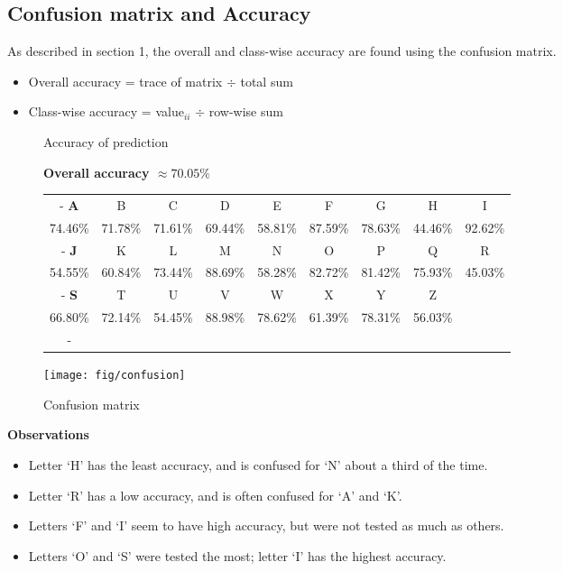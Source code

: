 \newpage
\subsection{Confusion matrix and Accuracy}
As described in section 1, the overall and class-wise accuracy are found using the confusion matrix.
\begin{itemize}[nosep]
	\item Overall accuracy = trace of matrix $\div$ total sum
	\item Class-wise accuracy = value$_{ii}$ $\div$ row-wise sum
\end{itemize}
\begin{figure}[h]
	\centering
	\small
	\caption{Accuracy of prediction}\par
	\textbf{Overall accuracy $\approx 70.05\%$}\par\medskip
	\begin{tabu}{|c|c|c |c|c|c |c|c|c |}
		\tabucline-\rowfont\bfseries
		A        &  B      &  C      &  D      &  E      &  F      &  G      &  H      &  I     \\
		74.46\% & 71.78\% & 71.61\% & 69.44\% & 58.81\% & 87.59\% & 78.63\% & 44.46\% & 92.62\% \\ 
		\tabucline-\rowfont\bfseries
		J       &  K      &  L      &  M      &  N      &  O      &  P      &  Q      &  R      \\
		54.55\% & 60.84\% & 73.44\% & 88.69\% & 58.28\% & 82.72\% & 81.42\% & 75.93\% & 45.03\% \\ 
		\tabucline-\rowfont\bfseries
		S       &  T      &  U      &  V      &  W      &  X      &  Y      &  Z      & \\
		66.80\% & 72.14\% & 54.45\% & 88.98\% & 78.62\% & 61.39\% & 78.31\% & 56.03\% & \\
		\tabucline-
	\end{tabu}
	\par\bigskip
	\caption{Confusion matrix}\par
	\texttt{[image: fig/confusion]}
\end{figure}

\textbf{Observations}
\begin{itemize}[itemsep=0pt]
	\item Letter `H' has the least accuracy, and is confused for `N' about a third of the time.
	\item Letter `R' has a low accuracy, and is often confused for `A' and `K'.
	\item Letters `F' and `I' seem to have high accuracy, but were not tested as much as others.
	\item Letters `O' and `S' were tested the most; letter `I' has the highest accuracy.
\end{itemize}